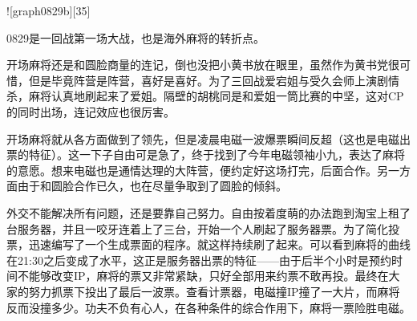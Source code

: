 
![graph0829b][35]

0829是一回战第一场大战，也是海外麻将的转折点。

开场麻将还是和圆脸商量的连记，倒也没把小黄书放在眼里，虽然作为黄书党很可惜，但是毕竟阵营是阵营，喜好是喜好。为了三回战爱宕姐与受久会师上演剧情杀，麻将认真地刷起来了爱姐。隔壁的胡桃同是和爱姐一筒比赛的中坚，这对CP的同时出场，连记效应也很厉害。

开场麻将就从各方面做到了领先，但是凌晨电磁一波爆票瞬间反超（这也是电磁出票的特征）。这一下子自由可是急了，终于找到了今年电磁领袖小九，表达了麻将的意愿。想来电磁也是通情达理的大阵营，便约定好这场打完，后面合作。另一方面由于和圆脸合作已久，也在尽量争取到了圆脸的倾斜。

外交不能解决所有问题，还是要靠自己努力。自由按着度萌的办法跑到淘宝上租了台服务器，并且一咬牙连着上了三台，开始一个人刷起了服务器票。为了简化投票，迅速编写了一个生成票面的程序。就这样持续刷了起来。可以看到麻将的曲线在21:30之后变成了水平，这正是服务器出票的特征——由于后半个小时是预约时间不能够改变IP，麻将的票又非常紧缺，只好全部用来约票不敢再投。最终在大家的努力抓票下投出了最后一波票。查看计票器，电磁撞IP撞了一大片，而麻将反而没撞多少。功夫不负有心人，在各种条件的综合作用下，麻将一票险胜电磁。

